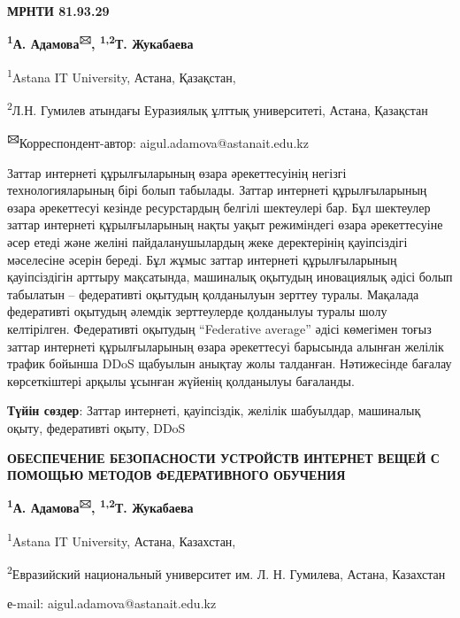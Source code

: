 
\newpage
{\bfseries МРНТИ 81.93.29}


\begin{center}

{\bfseries \textsuperscript{1}А. Адамова\textsuperscript{🖂},
\textsuperscript{1,2}Т. Жукабаева}

\textsuperscript{1}Astana IT University, Астана, Қазақстан,

\textsuperscript{2}Л.Н. Гумилев атындағы Еуразиялық ұлттық университеті,
Астана, Қазақстан

{\bfseries \textsuperscript{🖂}}Корреспондент-автор:
aigul.adamova@astanait.edu.kz
\end{center}

Заттар интернеті құрылғыларының өзара әрекеттесуінің негізгі
технологияларының бірі болып табылады. Заттар интернеті құрылғыларының
өзара әрекеттесуі кезінде ресурстардың белгілі шектеулері бар. Бұл
шектеулер заттар интернеті құрылғыларының нақты уақыт режиміндегі өзара
әрекеттесуіне әсер етеді және желіні пайдаланушылардың жеке деректерінің
қауіпсіздігі мәселесіне әсерін береді. Бұл жұмыс заттар интернеті
құрылғыларының қауіпсіздігін арттыру мақсатында, машиналық оқытудың
иновациялық әдісі болып табылатын -- федеративті оқытудың қолданылуын
зерттеу туралы. Мақалада федеративті оқытудың әлемдік зерттеулерде
қолданылуы туралы шолу келтірілген. Федеративті оқытудың ``Federative
average'' әдісі көмегімен тоғыз заттар интернеті құрылғыларының өзара
әрекеттесуі барысында алынған желілік трафик бойынша DDoS щабуылын
анықтау жолы талданған. Нәтижесінде бағалау көрсеткіштері арқылы ұсынған
жүйенің қолданылуы бағаланды.

{\bfseries Түйін сөздер}: Заттар интернеті, қауіпсіздік, желілік шабуылдар,
машиналық оқыту, федеративті оқыту, DDoS
\begin{center}

{\large\bfseries ОБЕСПЕЧЕНИЕ БЕЗОПАСНОСТИ УСТРОЙСТВ ИНТЕРНЕТ ВЕЩЕЙ С ПОМОЩЬЮ МЕТОДОВ ФЕДЕРАТИВНОГО ОБУЧЕНИЯ}

{\bfseries \textsuperscript{1}А. Адамова\textsuperscript{🖂},
\textsuperscript{1,2}Т. Жукабаева}

\textsuperscript{1}Astana IT University, Астана, Казахстан,

\textsuperscript{2}Евразийский национальный университет им. Л. Н.
Гумилева, Астана, Казахстан

е-mail: aigul.adamova@astanait.edu.kz
\end{center}

